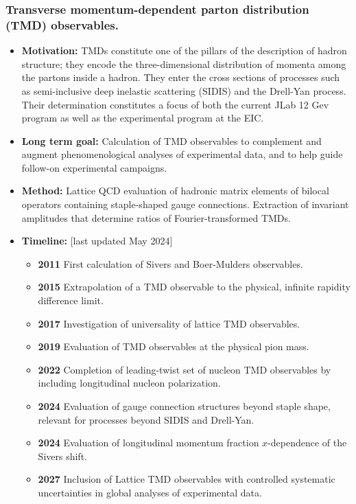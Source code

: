 \documentclass[12pt,hyperpdf]{article}
\begin{document}
\subsubsection{Transverse momentum-dependent parton distribution
(TMD) observables.}
\begin{itemize}
\item{\bf Motivation:} TMDs constitute one of the pillars of the description
of hadron structure; they encode the three-dimensional distribution of
momenta among the partons inside a hadron. They enter the cross sections
of processes such as semi-inclusive deep inelastic scattering (SIDIS) and
the Drell-Yan process. Their determination constitutes a focus of both the
current JLab 12 Gev program as well as the experimental program at the EIC.
\item{\bf Long term goal:} Calculation of TMD observables to
complement and augment phenomenological analyses of experimental data,
and to help guide follow-on experimental campaigns.
\item{\bf Method:} Lattice QCD evaluation of hadronic matrix elements of
bilocal operators containing staple-shaped gauge connections. Extraction
of invariant amplitudes that determine ratios of Fourier-transformed TMDs.
\item{\bf Timeline:} \hfill [last updated May 2024]
\begin{itemize}
\item{\bf 2011} First calculation of Sivers and Boer-Mulders observables.
\item{\bf 2015} Extrapolation of a TMD observable to the physical, infinite
rapidity difference limit.
\item{\bf 2017} Investigation of universality of lattice TMD observables.
\item{\bf 2019} Evaluation of TMD observables at the physical pion mass.
\item{\bf 2022} Completion of leading-twist set of nucleon TMD observables by
including longitudinal nucleon polarization.
\item{\bf 2024} Evaluation of gauge connection structures beyond staple shape,
relevant for processes beyond SIDIS and Drell-Yan.
\item{\bf 2024} Evaluation of longitudinal momentum fraction $x$-dependence
of the Sivers shift.
\item{\bf 2027} Inclusion of Lattice TMD observables with controlled systematic
uncertainties in global analyses of experimental data.
\end{itemize}
\end{itemize}
\end{document}
